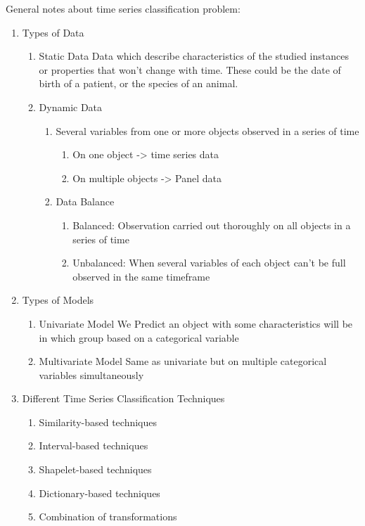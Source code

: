 General notes about time series classification problem:
\begin{enumerate}
    \item Types of Data
	    \begin{enumerate}
	        \item Static Data \newline
	        Data which describe characteristics of the studied instances or properties that won't change with time. These could be the date of birth of a patient, or the species of an animal.
	        \item Dynamic Data \newline
	            \begin{enumerate}
	                \item Several variables from one or more objects observed in a series of time
	                    \begin{enumerate}
	                        \item On one object -> time series data
	                        \item On multiple objects -> Panel data
	                    \end{enumerate}
                    \item Data Balance
                        \begin{enumerate}
                            \item Balanced: Observation carried out thoroughly on all objects in a series of time
                            \item Unbalanced: When several variables of each object can't be full observed in the same timeframe
                        \end{enumerate}
	            \end{enumerate}
	    \end{enumerate}
    \item Types of Models
	    \begin{enumerate}
	        \item Univariate Model \newline
	        We Predict an object with some characteristics will be in which group based on a categorical variable
		    \item Multivariate Model \newline
		    Same as univariate but on multiple categorical variables simultaneously
	    \end{enumerate}
    \item Different Time Series Classification Techniques
        \begin{enumerate}
            \item Similarity-based techniques
            \item Interval-based techniques
            \item Shapelet-based techniques
            \item Dictionary-based techniques
            \item Combination of transformations
        \end{enumerate}
\end{enumerate}